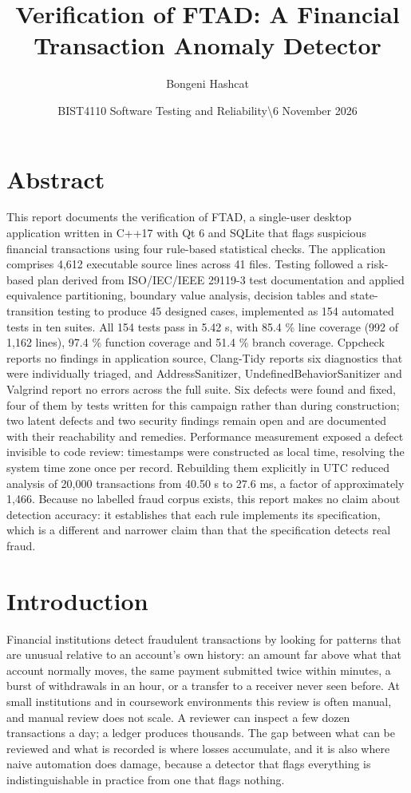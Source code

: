 \documentclass[
  12pt,
]{report}
\title{Verification of FTAD: A Financial Transaction Anomaly Detector}
\author{Bongeni Hashcat}
\date{BIST4110 Software Testing and Reliability\textbackslash6 November
2026}
\begin{document}
\maketitle

{
\setcounter{tocdepth}{1}
\tableofcontents
}
\chapter{Abstract}\label{abstract}

This report documents the verification of FTAD, a single-user desktop
application written in C++17 with Qt 6 and SQLite that flags suspicious
financial transactions using four rule-based statistical checks. The
application comprises 4,612 executable source lines across 41 files.
Testing followed a risk-based plan derived from ISO/IEC/IEEE 29119-3
test documentation and applied equivalence partitioning, boundary value
analysis, decision tables and state-transition testing to produce 45
designed cases, implemented as 154 automated tests in ten suites. All
154 tests pass in 5.42 s, with 85.4 \% line coverage (992 of 1,162
lines), 97.4 \% function coverage and 51.4 \% branch coverage. Cppcheck
reports no findings in application source, Clang-Tidy reports six
diagnostics that were individually triaged, and Address\-Sanitizer,
Undefined\-Behavior\-Sanitizer and Valgrind report no errors across the full
suite. Six defects were found and fixed, four of them by tests written
for this campaign rather than during construction; two latent defects
and two security findings remain open and are documented with their
reachability and remedies. Performance measurement exposed a defect
invisible to code review: timestamps were constructed as local time,
resolving the system time zone once per record. Rebuilding them
explicitly in UTC reduced analysis of 20,000 transactions from 40.50 s
to 27.6 ms, a factor of approximately 1,466. Because no labelled fraud
corpus exists, this report makes no claim about detection accuracy: it
establishes that each rule implements its specification, which is a
different and narrower claim than that the specification detects real
fraud.

\chapter{Introduction}\label{introduction}

Financial institutions detect fraudulent transactions by looking for
patterns that are unusual relative to an account's own history: an
amount far above what that account normally moves, the same payment
submitted twice within minutes, a burst of withdrawals in an hour, or a
transfer to a receiver never seen before. At small institutions and in
coursework environments this review is often manual, and manual review
does not scale. A reviewer can inspect a few dozen transactions a day; a
ledger produces thousands. The gap between what can be reviewed and what
is recorded is where losses accumulate, and it is also where naive
automation does damage, because a detector that flags everything is
indistinguishable in practice from one that flags nothing.
\end{document}
